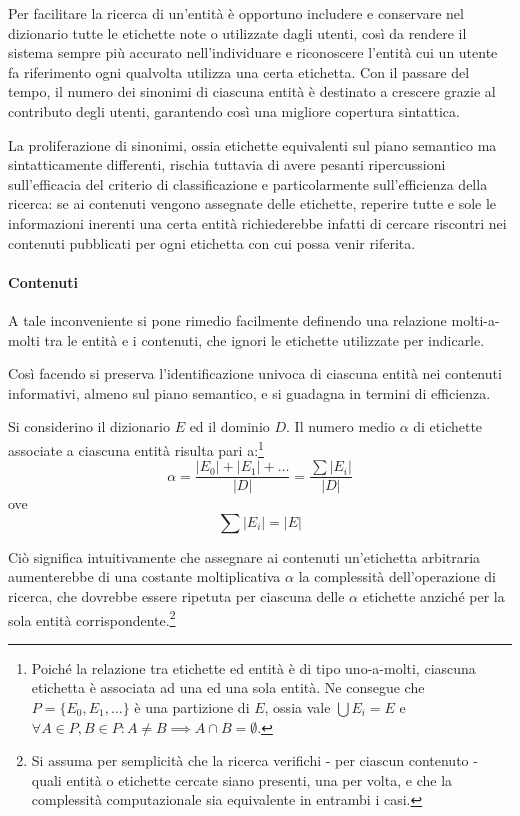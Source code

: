 Per facilitare la ricerca di un'entità è opportuno includere e conservare nel dizionario tutte le etichette note o utilizzate dagli utenti, così da rendere il sistema sempre più accurato nell'individuare e riconoscere l'entità cui un utente fa riferimento ogni qualvolta utilizza una certa etichetta. Con il passare del tempo, il numero dei sinonimi di ciascuna entità è destinato a crescere grazie al contributo degli utenti, garantendo così una migliore copertura sintattica.

La proliferazione di sinonimi, ossia etichette equivalenti sul piano semantico ma sintatticamente differenti, rischia tuttavia di avere pesanti ripercussioni sull'efficacia del criterio di classificazione e particolarmente sull'efficienza della ricerca: se ai contenuti vengono assegnate delle etichette, reperire tutte e sole le informazioni inerenti una certa entità richiederebbe infatti di cercare riscontri nei contenuti pubblicati per ogni etichetta con cui possa venir riferita.

\paragraph{Contenuti}
A tale inconveniente si pone rimedio facilmente definendo una relazione molti-a-molti tra le entità e i contenuti, che ignori le etichette utilizzate per indicarle.

Così facendo si preserva l'identificazione univoca di ciascuna entità nei contenuti informativi, almeno sul piano semantico, e si guadagna in termini di efficienza.

Si considerino il dizionario $E$ ed il dominio $D$. Il numero medio $\alpha$ di etichette associate a ciascuna entità risulta pari a:\footnote{Poiché la relazione tra etichette ed entità è di tipo uno-a-molti, ciascuna etichetta è associata ad una ed una sola entità. Ne consegue che $P = \{ E_0, E_1, \ldots \}$ è una partizione di $E$, ossia vale $\bigcup E_i = E$ e $\forall A \in P, B \in P: A \neq B \implies A \cap B = \emptyset$.}
\begin{equation} \label{eq:tesi:stage:etichette-per-entità}
\alpha = \frac{\left|E_0\right| + \left|E_1\right| + \ldots}{\left|D\right|} = \frac{\sum{\left|E_i\right|}}{\left|D\right|}
\end{equation}
ove
\begin{equation} \label{eq:tesi:stage:dizionario}
\sum{\left|E_i\right|} = \left|E\right|
\end{equation}

Ciò significa intuitivamente che assegnare ai contenuti un'etichetta arbitraria aumenterebbe di una costante moltiplicativa $\alpha$ la complessità dell'operazione di ricerca, che dovrebbe essere ripetuta per ciascuna delle $\alpha$ etichette anziché per la sola entità corrispondente.\footnote{Si assuma per semplicità che la ricerca verifichi - per ciascun contenuto - quali entità o etichette cercate siano presenti, una per volta, e che la complessità computazionale sia equivalente in entrambi i casi.}

